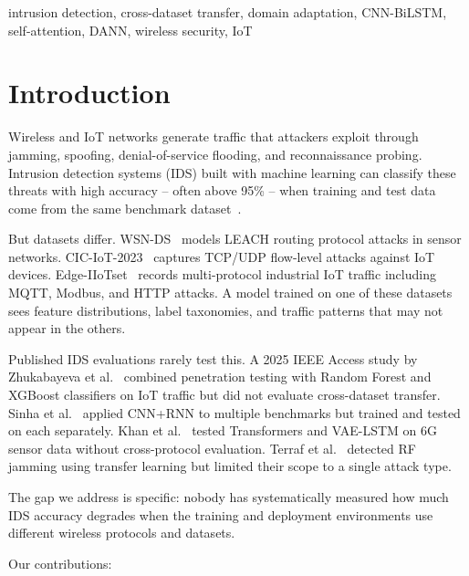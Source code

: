 \documentclass[conference]{IEEEtran}
\begin{document}
\begin{IEEEkeywords}
intrusion detection, cross-dataset transfer, domain adaptation, CNN-BiLSTM, self-attention, DANN, wireless security, IoT
\end{IEEEkeywords}

\section{Introduction}

Wireless and IoT networks generate traffic that attackers exploit through jamming, spoofing, denial-of-service flooding, and reconnaissance probing. Intrusion detection systems (IDS) built with machine learning can classify these threats with high accuracy -- often above 95\% -- when training and test data come from the same benchmark dataset~\cite{zhukabayeva2025penetration, phalaagae2025hybrid}.

But datasets differ. WSN-DS~\cite{almomani2016wsn} models LEACH routing protocol attacks in sensor networks. CIC-IoT-2023~\cite{neto2023ciciot} captures TCP/UDP flow-level attacks against IoT devices. Edge-IIoTset~\cite{ferrag2022edge} records multi-protocol industrial IoT traffic including MQTT, Modbus, and HTTP attacks. A model trained on one of these datasets sees feature distributions, label taxonomies, and traffic patterns that may not appear in the others.

Published IDS evaluations rarely test this. A 2025 IEEE Access study by Zhukabayeva et al.~\cite{zhukabayeva2025penetration} combined penetration testing with Random Forest and XGBoost classifiers on IoT traffic but did not evaluate cross-dataset transfer. Sinha et al.~\cite{sinha2025efficient} applied CNN+RNN to multiple benchmarks but trained and tested on each separately. Khan et al.~\cite{khan2025enhancing} tested Transformers and VAE-LSTM on 6G sensor data without cross-protocol evaluation. Terraf et al.~\cite{terraf2026jamming} detected RF jamming using transfer learning but limited their scope to a single attack type.

The gap we address is specific: nobody has systematically measured how much IDS accuracy degrades when the training and deployment environments use different wireless protocols and datasets.

Our contributions:
\end{document}
